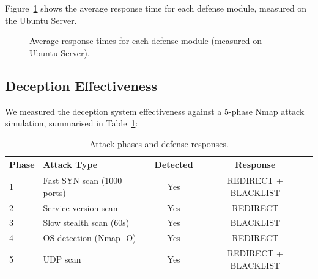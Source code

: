 \documentclass[12pt,a4paper]{report}
\begin{document}
Figure~\ref{fig:timing} shows the average response time for each defense module, measured on the Ubuntu Server.

\begin{figure}[H]
\centering
{}
\caption{Average response times for each defense module (measured on Ubuntu Server).}
\label{fig:timing}
\end{figure}

\subsection{Deception Effectiveness}

We measured the deception system effectiveness against a 5-phase Nmap attack simulation, summarised in Table~\ref{tab:attack_results}:

\begin{table}[H]
\centering
\caption{Attack phases and defense responses.}
\label{tab:attack_results}
\begin{tabular}{l l c c}
\toprule
\textbf{Phase} & \textbf{Attack Type} & \textbf{Detected} & \textbf{Response} \\
\midrule
1 & Fast SYN scan (1000 ports) & Yes & REDIRECT + BLACKLIST \\
2 & Service version scan & Yes & REDIRECT \\
3 & Slow stealth scan (60s) & Yes & BLACKLIST \\
4 & OS detection (Nmap -O) & Yes & REDIRECT \\
5 & UDP scan & Yes & REDIRECT + BLACKLIST \\
\bottomrule
\end{tabular}
\end{table}
\end{document}
